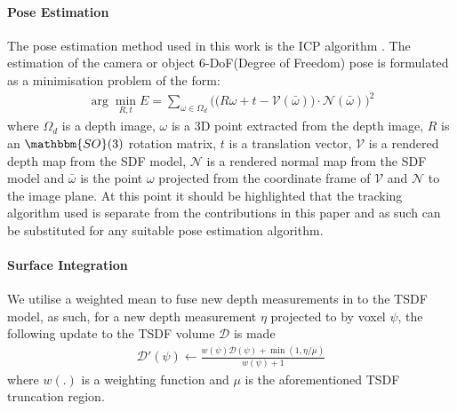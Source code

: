 \paragraph{Pose Estimation}
The pose estimation method used in this work is the ICP algorithm \cite{Besl1992}. The estimation of 
the camera or object 6-DoF(Degree of Freedom) pose is formulated as a minimisation problem of the form:
\begin{equation}
	\begin{split}
		\arg \min_{R, t} E = \sum_{\omega \in \Omega_{d}} \bigg( \big( R\omega + t - \mathcal{V}(\bar{\omega}) \big) \cdot \mathcal{N}(\bar{\omega}) \bigg)^{2}
	\end{split}
\end{equation}
where $\Omega_{d}$ is a depth image, $\omega$ is a 3D point extracted from the depth image, $R$ is an  $\mathbbm{SO}(3)$ 
rotation matrix, $t$ is a translation vector, $\mathcal{V}$ is a rendered depth map from the SDF model, $\mathcal{N}$ is a rendered 
normal map from the SDF model and $\bar{\omega}$ is the point $\omega$ projected from the coordinate frame of $\mathcal{V}$ and 
$\mathcal{N}$ to the image plane. At this point it should be highlighted that the tracking algorithm used is separate from the contributions in this paper and 
as such can be substituted for any suitable pose estimation algorithm.

\paragraph{Surface Integration}
We utilise a weighted mean to fuse new depth measurements in to the TSDF model, as such, for a new depth measurement $\eta$ projected to by voxel $\psi$, 
the following update to the TSDF volume $\mathcal{D}$ is made
\begin{equation}
	\begin{split}
		\mathcal{D}'(\psi) \leftarrow \frac{w(\psi)\mathcal{D}(\psi) + \min(1, \eta/\mu)}{w(\psi) + 1}
	\end{split}
\end{equation}
where $w(.)$ is a weighting function and $\mu$ is the aforementioned TSDF truncation region.